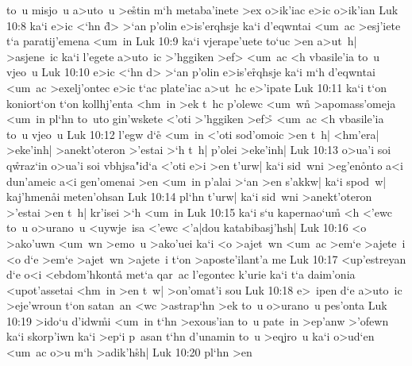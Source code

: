 to~u
misjo~u
a>uto~u
>e\r{s}tin
m`h
metaba'inete
>ex
o>ik'iac
e>ic
o>ik'ian\bibvsend
\vs Luk 10:8
ka`i
e>ic
<`hn
\r{d}>
>`an
p'olin
e>is'erqhsje
ka`i
d'eqwntai
<um~ac
>esj'iete
t`a
paratij'emena
<um~in\bibvsend
\vs Luk 10:9
ka`i
vjerape'uete
to`uc
>en
a>ut~h|
>asjene~ic
ka`i
l'egete
a>uto~ic
>'hggiken
>ef>
<um~ac
<h
vbasile'ia
to~u
vjeo~u\bibvsend
\vs Luk 10:10
e>ic
<`hn
d>
>`an
p'olin
e>is'e\r{r}qhsje
ka`i
m`h
d'eqwntai
<um~ac
>exelj'ontec
e>ic
t`ac
plate'iac
a>ut~hc
e>'ipate\bibvsend
\vs Luk 10:11
ka`i
t`on
koniort`on
t`on
kollhj'enta
<hm~in
>ek
t~hc
p'olewc
<um~w\r{n}
>apomass'omeja
<um~in
pl`hn
to~uto
gin'wskete
<'oti
>'hggiken
>ef>\r{}
<um~ac
<h
vbasile'ia
to~u
vjeo~u\bibvsend
\vs Luk 10:12
l'egw
d`e\r{}
<um~in
<'oti
sod'omoic
>en
t~h|
<hm'era|
>eke'inh|
>anekt'oteron
>'estai
>`h
t~h|
p'olei
>eke'inh|\bibvsend
\vs Luk 10:13
o>ua'i
soi
q\r{w}raz`in
o>ua'i
soi
vbhjsa"id`a
<'oti
e>i
>en
t'urw|
ka`i
sid~wni
>eg'en\r{o}nto
a<i
dun'ameic
a<i
gen'omenai
>en
<um~in
p'alai
>`an
>en
s'akkw|
ka`i
spod~w|
kaj'hmen\r{a}i
meten'ohsan\bibvsend
\vs Luk 10:14
pl`hn
t'urw|
ka`i
sid~wni
>anekt'oteron
>'estai
>en
t~h|
kr'isei
>`h
<um~in\bibvsend
\vs Luk 10:15
ka`i
s`u
kapernao`um\r{}
<h
<'ewc
to~u
o>urano~u
<uywje~isa
<'ewc
<'a|dou
katabibasj'hsh|\bibvsend
\vs Luk 10:16
<o
>ako'uwn
<um~wn
>emo~u
>ako'uei
ka`i
<o
>ajet~wn
<um~ac
>em`e
>ajete~i
<o
d`e
>em`e
>ajet~wn
>ajete~i
t`on
>aposte'ilant'a
me\bibvsend
\vs Luk 10:17
<up'estreyan
d`e
o<i
<ebdom'hkont\r{a}
met`a
qar~ac
l'egontec
k'urie
ka`i
t`a
daim'onia
<upot'assetai
<hm~in
>en
t~w|
>on'omat'i
sou\bibvsend
\vs Luk 10:18
e>~ipen
d`e
a>uto~ic
>eje'wroun
t`on
satan~an
<wc
>astrap`hn
>ek
to~u
o>urano~u
pes'onta\bibvsend
\vs Luk 10:19
>ido`u
d'idw\r{m}i
<um~in
t`hn
>exous'ian
to~u
pate~in
>ep'anw
>'ofewn
ka`i
skorp'iwn
ka`i
>ep`i
p~asan
t`hn
d'unamin
to~u
>eqjro~u
ka`i
o>ud`en
<um~ac
o>u
m`h
>adik'h\r{s}h|\bibvsend
{}
\vs Luk 10:20
pl`hn
>en
